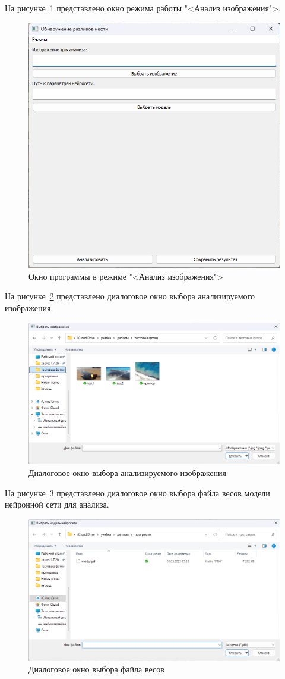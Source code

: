 На рисунке~\ref{fig:ui_analysis_mode} представлено окно режима работы "<Анализ изображения">.
\begin{figure}[H]
	\centering
	\includegraphics[width=0.7\linewidth]{"images/анализ окно"}
	\caption{Окно программы в режиме "<Анализ изображения">}
	\label{fig:ui_analysis_mode}
\end{figure}

На рисунке~\ref{fig:analyze_select_image} представлено диалоговое окно выбора анализируемого изображения.

\begin{figure}[H]
	\centering
	\includegraphics[width=0.7\linewidth]{"images/выбор анализируемого изображения"}
	\caption{Диалоговое окно выбора анализируемого изображения}
	\label{fig:analyze_select_image}
\end{figure}

На рисунке~\ref{fig:model_select_analyze} представлено диалоговое окно выбора файла весов модели нейронной сети для анализа.
\begin{figure}[H]
	\centering
	\includegraphics[width=0.7\linewidth]{"images/выбор модели анализ"}
	\caption{Диалоговое окно выбора файла весов}
	\label{fig:model_select_analyze}
\end{figure}

